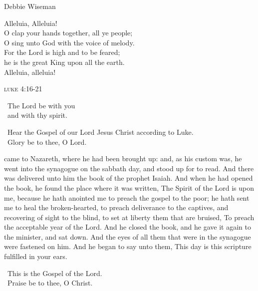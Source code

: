 {\vfill 
{}
{Debbie Wiseman}


\begin{center}
Alleluia, Alleluia!\\
O clap your hands together, all ye people;\\
O sing unto God with the voice of melody.\\
For the Lord is high and to be feared;\\
he is the great King upon all the earth.\\
Alleluia, alleluia!
\end{center}

\vfill 

\clearpage


\begin{center}\color{qred}\textsc{luke 4:16-21}\end{center}




\vrscl\ The Lord be with you\\
\rspns\ and with thy spirit.

\vrscl\ Hear the Gospel of our Lord Jesus Christ according to Luke.\\
\rspns\ Glory be to thee, O Lord.

\vfill 

 came to Nazareth, where he had been brought up: and, as his custom
was, he went into the synagogue on the sabbath day, and stood up for to
read. And there was delivered unto him the book of the prophet Isaiah.
And when he had opened the book, he found the place where it was
written, The Spirit of the Lord is upon me, because he hath anointed me to
preach the gospel to the poor; he hath sent me to heal the broken-hearted,
to preach deliverance to the captives, and recovering of sight to the blind,
to set at liberty them that are bruised, To preach the acceptable year of the
Lord. And he closed the book, and he gave it again to the minister, and sat
down. And the eyes of all them that were in the synagogue were fastened
on him. And he began to say unto them, This day is this scripture fulfilled
in your ears.

\vrscl\ This is the Gospel of the Lord.\\
\rspns\ Praise be to thee, O Christ.
\vfill
{}


\begin{center}
	

\end{center}}
